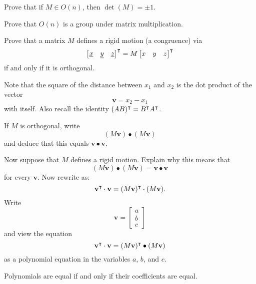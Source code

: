 \documentclass{ximera}
\begin{document}
\begin{exercise}
  Prove that if $M\in O(n)$, then $\det(M) = \pm 1$.
\end{exercise}


\begin{exercise}
  Prove that $O(n)$ is a group under matrix multiplication.
\end{exercise}




\begin{exercise}
  Prove that a matrix $ M$ defines a rigid motion (a congruence)
  via
  \[
  \begin{bmatrix}
    \underline{x} & \underline{y} & \underline{z}%
  \end{bmatrix}^\transpose
  = M \begin{bmatrix} x & y & z\end{bmatrix}^\transpose
  \]
  if and only if it is orthogonal.

  \begin{hint}
    Note that the square of the distance between $x_{1}$ and
    $x_{2}$ is the dot product of the vector%
    \[
    {\mathbf v}=x_{2}-x_{1}%
    \]
    with itself.  Also recall the identity $(AB)^\intercal=B^\intercal A^\intercal$.
  \end{hint}
  \begin{hint}
    If $ M$ is orthogonal, write
    \[
    ( M{\mathbf v}) \bullet ( M{\mathbf v})
    \]
    and deduce that this equals ${\mathbf v}\bullet{\mathbf v}$. 
  \end{hint}
  \begin{hint}
    Now suppose that $ M$ defines a rigid motion. Explain why this means
    that
    \[
    ( M{\mathbf v}) \bullet ( M{\mathbf v})=
    {\mathbf v} \bullet {\mathbf v}
    \]
    for every ${\mathbf v}$.  Now rewrite as:
    \[
    {\mathbf v}^\intercal \cdot{\mathbf v}
    =( M{\mathbf v})^\intercal \cdot ( M{\mathbf v}).
    \]
    Write
    \[
    {\mathbf v} =
    \begin{bmatrix}
      a \\ b \\ c
    \end{bmatrix}
    \]
     and view the equation 
    \[
    {\mathbf v}^\intercal \cdot{\mathbf v}
    =( M{\mathbf v})^\intercal \bullet ( M{\mathbf v})
    \]
    as a polynomial equation in the variables $a$, $b$, and $c$. 
  \end{hint}
  \begin{hint}
    Polynomials are equal if and only if their coefficients are equal. 
  \end{hint}
\end{exercise}
\end{document}

